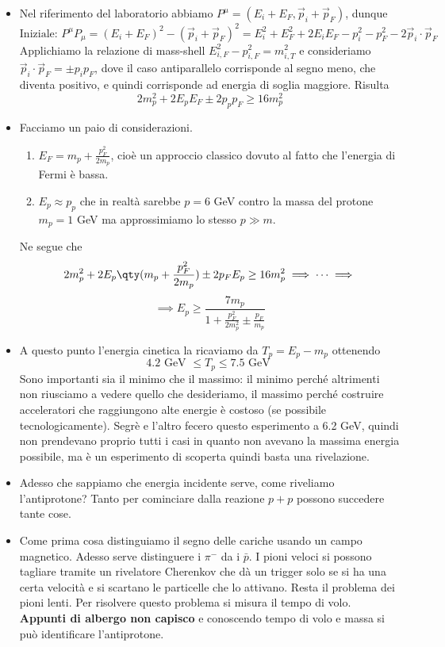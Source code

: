 \begin{itemize}
    \item Nel riferimento del laboratorio abbiamo $P^\mu=(E_i+E_F,\vec p_i+\vec p_F)$, dunque
    \begin{equation*}
    \text{Iniziale: } P^\mu P_\mu=(E_i+E_F)^2-(\vec p_i+\vec p_F)^2=E_i^2+E_F^2+2E_iE_F-p_i^2-p_F^2-2\vec p_i\cdot\vec p_F
    \end{equation*}
    Applichiamo la relazione di mass-shell $E_{i,F}^2-p_{i,F}^2=m_{i,T}^2$ e consideriamo $\vec p_i\cdot\vec p_F=\pm p_ip_F$, dove il caso antiparallelo corrisponde al segno meno, che diventa positivo, e quindi corrisponde ad energia di soglia maggiore. Risulta
    \begin{equation*}
        2m_p^2+2E_pE_F\pm2p_pp_F\geq 16m_p^2
    \end{equation*}
    \item Facciamo un paio di considerazioni.
    \begin{enumerate}
        \item $E_F=m_p+\frac{p_F^2}{2m_p}$, cioè un approccio classico dovuto al fatto che l'energia di Fermi è bassa.
        \item $E_p\approx p_p$ che in realtà sarebbe $p=6$ GeV contro la massa del protone $m_p=1$ GeV ma approssimiamo lo stesso $p\gg m$. 
    \end{enumerate}
    Ne segue che 
    \begin{equation*}
        2m_p^2+2E_p\qty(m_p+\frac{p_F^2}{2m_p})\pm 2p_FE_p\geq 16m_p^2\implies\dots\implies
    \end{equation*}
    \begin{equation*}
        \implies E_p\geq\frac{7m_p}{1+\frac{p_F^2}{2m_p^2}\pm\frac{p_F}{m_p}}
    \end{equation*}
    \item A questo punto l'energia cinetica la ricaviamo da $T_p=E_p-m_p$ ottenendo 
    \begin{equation*}
    4.2\text{ GeV }\leq T_p\leq 7.5\text{ GeV }
    \end{equation*}
    Sono importanti sia il minimo che il massimo: il minimo perché altrimenti non riusciamo a vedere quello che desideriamo, il massimo perché costruire acceleratori che raggiungono alte energie è costoso (se possibile tecnologicamente). Segrè e l'altro fecero questo esperimento a 6.2 GeV, quindi non prendevano proprio tutti i casi in quanto non avevano la massima energia possibile, ma è un esperimento di scoperta quindi basta una rivelazione.
    \item Adesso che sappiamo che energia incidente serve, come riveliamo l'antiprotone? Tanto per cominciare dalla reazione $p+p$ possono succedere tante cose.
    \item Come prima cosa distinguiamo il segno delle cariche usando un campo magnetico. Adesso serve distinguere i $\pi^-$ da i $\bar p$.  I pioni veloci si possono tagliare tramite un rivelatore Cherenkov che dà un trigger solo se si ha una certa velocità e si scartano le particelle che lo attivano. Resta il problema dei pioni lenti. Per risolvere questo problema si misura il tempo di volo. \textbf{Appunti di albergo non capisco} e conoscendo tempo di volo e massa si può identificare l'antiprotone.
\end{itemize}
